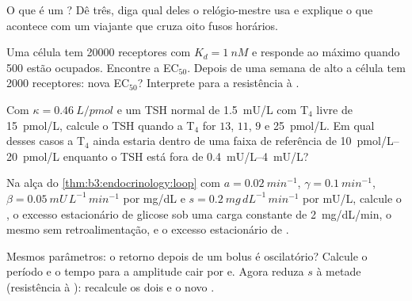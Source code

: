 \begin{exercise}[$\star$]\label{exo:b3:endocrinology:4}
O que é um ? Dê três, diga qual deles o relógio-mestre usa e
explique o que acontece com um viajante que cruza oito fusos horários.
\end{exercise}

\begin{exercise}[$\star\star$]\label{exo:b3:endocrinology:5}
Uma célula tem \num{20000} receptores com $K_{d} = \qty{1}{nM}$ e
responde ao máximo quando \num{500} estão ocupados. Encontre a
EC$_{50}$. Depois de uma semana de  alto a célula tem \num{2000}
receptores: nova EC$_{50}$? Interprete para a resistência à .
\end{exercise}

\begin{exercise}[$\star\star$]\label{exo:b3:endocrinology:6}
Com $\kappa = \qty{0.46}{L/pmol}$ e um TSH normal de \qty{1.5}{mU/L} com
T$_{4}$ livre de \qty{15}{pmol/L}, calcule o TSH quando a T$_{4}$ for
$13$, $11$, $9$ e \qty{25}{pmol/L}. Em qual desses casos a T$_{4}$ ainda
estaria dentro de uma faixa de referência de
\qtyrange{10}{20}{pmol/L} enquanto o TSH está fora de
\qtyrange{0.4}{4}{mU/L}?
\end{exercise}

\begin{exercise}[$\star\star$]\label{exo:b3:endocrinology:7}
Na alça do \cref{thm:b3:endocrinology:loop} com $a = \qty{0.02}{min^{-1}}$,
$\gamma = \qty{0.1}{min^{-1}}$, $\beta = \qty{0.05}{mU\,L^{-1}\,min^{-1}}$
por mg/dL e $s = \qty{0.2}{mg\,dL^{-1}\,min^{-1}}$ por mU/L, calcule o
, o excesso estacionário de glicose sob uma carga constante
de \qty{2}{mg/dL/min}, o mesmo sem retroalimentação, e o excesso
estacionário de .
\end{exercise}

\begin{exercise}[$\star\star$]\label{exo:b3:endocrinology:8}
Mesmos parâmetros: o retorno depois de um bolus é oscilatório? Calcule o
período e o tempo para a amplitude cair por $\mathrm{e}$. Agora reduza
$s$ à metade (resistência à ): recalcule os dois e o novo .
\end{exercise}

